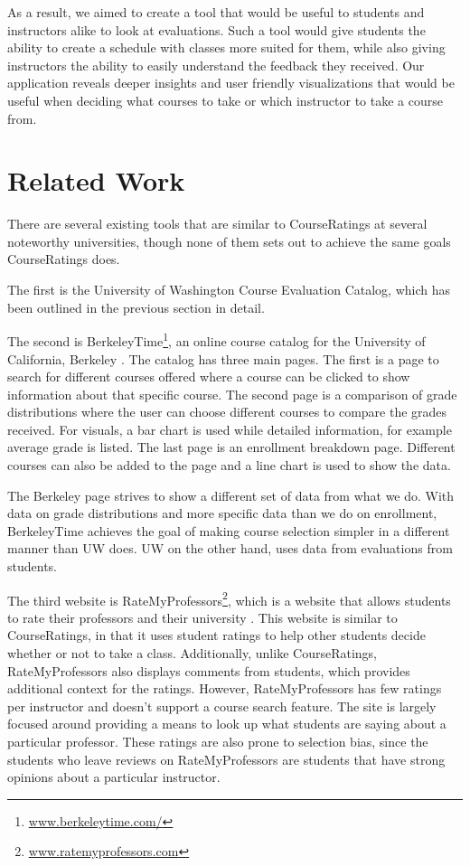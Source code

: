 \documentclass{chi2009}
\begin{document}
As a result, we aimed to create a tool that would be useful to students and instructors alike to look at evaluations.  Such a tool would give students the ability to create a schedule with classes more suited for them, while also giving instructors the ability to easily understand the feedback they received. Our application reveals deeper insights and user friendly visualizations that would be useful when deciding what courses to take or which instructor to take a course from.

\section{Related Work}

There are several existing tools that are similar to CourseRatings at several noteworthy universities, though none of them sets out to achieve the same goals CourseRatings does.

The first is the University of Washington Course Evaluation Catalog, which has been outlined in the previous section in detail.

The second is BerkeleyTime\footnote{\href{www.berkeleytime.com/}{www.berkeleytime.com/}}, an online course catalog for the University of California, Berkeley \cite{berkeleytime}. The catalog has three main pages.  The first is a page to search for different courses offered where a course can be clicked to show information about that specific course. The second page is a comparison of grade distributions where the user can choose different courses to compare the grades received. For visuals, a bar chart is used while detailed information, for example average grade is listed. The last page is an enrollment breakdown page.  Different courses can also be added to the page and a line chart is used to show the data.

The Berkeley page strives to show a different set of data from what we do.  With data on grade distributions and more specific data than we do on enrollment, BerkeleyTime achieves the goal of making course selection simpler in a different manner than UW does. UW on the other hand, uses data from evaluations from students.

The third website is RateMyProfessors\footnote{\href{www.ratemyprofessors.com}{www.ratemyprofessors.com}}, which is a website that allows students to rate their professors and their university \cite{ratemyprofessors}. This website is similar to CourseRatings, in that it uses student ratings to help other students decide whether or not to take a class. Additionally, unlike CourseRatings, RateMyProfessors also displays comments from students, which provides additional context for the ratings. However, RateMyProfessors has few ratings per instructor and doesn't support a course search feature. The site is largely focused around providing a means to look up what students are saying about a particular professor. These ratings are also prone to selection bias, since the students who leave reviews on RateMyProfessors are students that have strong opinions about a particular instructor.
\end{document}
